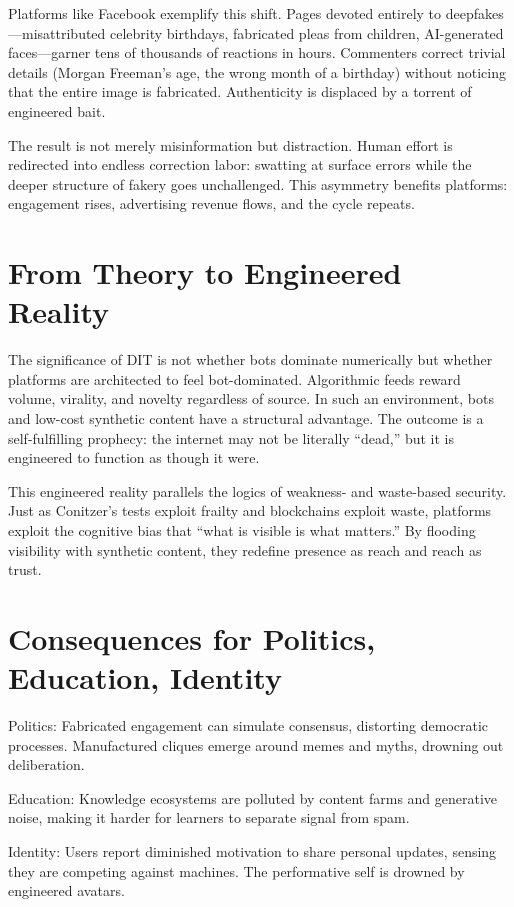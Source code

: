 \documentclass{book}
\begin{document}
Platforms like Facebook exemplify this shift. Pages devoted entirely to deepfakes—misattributed celebrity birthdays, fabricated pleas from children, AI-generated faces—garner tens of thousands of reactions in hours. Commenters correct trivial details (Morgan Freeman’s age, the wrong month of a birthday) without noticing that the entire image is fabricated. Authenticity is displaced by a torrent of engineered bait.

The result is not merely misinformation but distraction. Human effort is redirected into endless correction labor: swatting at surface errors while the deeper structure of fakery goes unchallenged. This asymmetry benefits platforms: engagement rises, advertising revenue flows, and the cycle repeats.

\section{From Theory to Engineered Reality}

The significance of DIT is not whether bots dominate numerically but whether platforms are architected to feel bot-dominated. Algorithmic feeds reward volume, virality, and novelty regardless of source. In such an environment, bots and low-cost synthetic content have a structural advantage. The outcome is a self-fulfilling prophecy: the internet may not be literally “dead,” but it is engineered to function as though it were.

This engineered reality parallels the logics of weakness- and waste-based security. Just as Conitzer’s tests exploit frailty and blockchains exploit waste, platforms exploit the cognitive bias that “what is visible is what matters.” By flooding visibility with synthetic content, they redefine presence as reach and reach as trust.

\section{Consequences for Politics, Education, Identity}

Politics: Fabricated engagement can simulate consensus, distorting democratic processes. Manufactured cliques emerge around memes and myths, drowning out deliberation.

Education: Knowledge ecosystems are polluted by content farms and generative noise, making it harder for learners to separate signal from spam.

Identity: Users report diminished motivation to share personal updates, sensing they are competing against machines. The performative self is drowned by engineered avatars.
\end{document}
